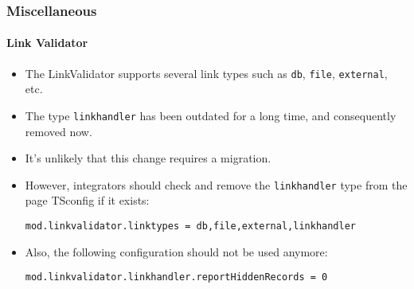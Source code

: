 %

\begin{frame}[fragile]
	\frametitle{Miscellaneous}
	\framesubtitle{Link Validator}


	\begin{itemize}
		\item The LinkValidator supports several link types such as
			\small\texttt{db}\normalsize, \small\texttt{file}\normalsize,
			\small\texttt{external}\normalsize, etc.
		\item The type \small\texttt{linkhandler}\normalsize
			has been outdated for a long time, and consequently removed now.
		\item It's unlikely that this change requires a migration.
		\item However, integrators should check and remove the \texttt{linkhandler}
			type from the page TSconfig if it exists:
\begin{lstlisting}
mod.linkvalidator.linktypes = db,file,external,linkhandler
\end{lstlisting}

		\item Also, the following configuration should not be used anymore:
\begin{lstlisting}
mod.linkvalidator.linkhandler.reportHiddenRecords = 0
\end{lstlisting}

	\end{itemize}

\end{frame}

